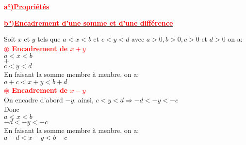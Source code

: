 \documentclass[12pt]{article}
\begin{document}
\begin{center}
\underline{\textbf{\textcolor{red}{a°)Propriétés}}}
\end{center}

\begin{center}
\underline{\textbf{\textcolor{red}{b°)Encadrement d'une somme et d'une différence}}}\\
\end{center}

Soit $x$ et $y$ tels que $a<x<b$ et $c<y<d$ avec $a>0,b>0,c>0$ et $d>0$ on a:\\
\textbf{\textcolor{red}{$\circledast$ Encadrement de $x+y$}}\\
$a<x<b$\\
$+$\\
$c<y<d$\\
En faisant la somme membre à menbre, on a:\\
$a+c<x+y<b+d$\\
\textbf{\textcolor{red}{$\circledast$ Encadrement de $x-y$}}\\
On encadre d'abord $-y$.
ainsi, $c<y<d \Rightarrow -d<-y<-c$ \\
Donc \\
$a<x<b$\\
$-d<-y<-c$\\
En faisant la somme membre à menbre, on a:\\
$a-d<x-y<b-c$
\end{document}
